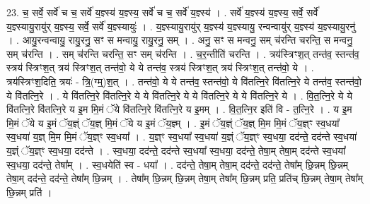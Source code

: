 \documentclass[17pt]{extarticle}
\begin{document}
23. च॒ सर्वे॒ सर्वे॑ च च॒ सर्वे॑ य॒ज्ञ्स्य॑ य॒ज्ञ्स्य॒ सर्वे॑ च च॒ सर्वे॑ य॒ज्ञ्स्य॑ । . सर्वे॑ य॒ज्ञ्स्य॑ य॒ज्ञ्स्य॒ सर्वे॒ सर्वे॑ य॒ज्ञ्स्यायु॒रायु॑र् य॒ज्ञ्स्य॒ सर्वे॒ सर्वे॑ य॒ज्ञ्स्यायुः॑ । . य॒ज्ञ्स्यायु॒रायु॑र् य॒ज्ञ्स्य॑ य॒ज्ञ्स्यायु॒ रन्वन्वायु॑र् य॒ज्ञ्स्य॑ य॒ज्ञ्स्यायु॒रनु॑ । . आयु॒रन्वन्वायु॒ रायु॒रनु॒ सꣳ स मन्वायु॒ रायु॒रनु॒ सम् । . अनु॒ सꣳ स मन्वनु॒ सम् च॑रन्ति चरन्ति॒ स मन्वनु॒ सम् च॑रन्ति । . सम् च॑रन्ति चरन्ति॒ सꣳ सम् च॑रन्ति । . च॒र॒न्तीति॑ चरन्ति । . त्रय॑स्त्रिꣳश॒त् तन्त॑व॒ स्तन्त॑व॒ स्त्रय॑ स्त्रिꣳश॒त् त्रय॑ स्त्रिꣳश॒त् तन्त॑वो॒ ये ये तन्त॑व॒ स्त्रय॑ स्त्रिꣳश॒त् त्रय॑ स्त्रिꣳश॒त् तन्त॑वो॒ ये । . त्रय॑स्त्रिꣳश॒दिति॒ त्रयः॑ - त्रि॒(ग्म्॒)श॒त् । . तन्त॑वो॒ ये ये तन्त॑व॒ स्तन्त॑वो॒ ये वि॑तत्नि॒रे वि॑तत्नि॒रे ये तन्त॑व॒ स्तन्त॑वो॒ ये वि॑तत्नि॒रे । . ये वि॑तत्नि॒रे वि॑तत्नि॒रे ये ये वि॑तत्नि॒रे ये ये वि॑तत्नि॒रे ये ये वि॑तत्नि॒रे ये । . वि॒त॒त्नि॒रे ये ये वि॑तत्नि॒रे वि॑तत्नि॒रे य इ॒म मि॒मं ॅये वि॑तत्नि॒रे वि॑तत्नि॒रे य इ॒मम् । . वि॒त॒त्नि॒र इति॑ वि - त॒त्नि॒रे । . य इ॒म मि॒मं ॅये य इ॒मं ॅय॒ज्ञ्ं ॅय॒ज्ञ् मि॒मं ॅये य इ॒मं ॅय॒ज्ञ्म् । . इ॒मं ॅय॒ज्ञ्ं ॅय॒ज्ञ् मि॒म मि॒मं ॅय॒ज्ञ्ꣳ स्व॒धया᳚ स्व॒धया॑ य॒ज्ञ् मि॒म मि॒मं ॅय॒ज्ञ्ꣳ स्व॒धया᳚ । . य॒ज्ञ्ꣳ स्व॒धया᳚ स्व॒धया॑ य॒ज्ञ्ं ॅय॒ज्ञ्ꣳ स्व॒धया॒ दद॑न्ते॒ दद॑न्ते स्व॒धया॑ य॒ज्ञ्ं ॅय॒ज्ञ्ꣳ स्व॒धया॒ दद॑न्ते । . स्व॒धया॒ दद॑न्ते॒ दद॑न्ते स्व॒धया᳚ स्व॒धया॒ दद॑न्ते॒ तेषा॒म् तेषा॒म् दद॑न्ते स्व॒धया᳚ स्व॒धया॒ दद॑न्ते॒ तेषा᳚म् । . स्व॒धयेति॑ स्व - धया᳚ । . दद॑न्ते॒ तेषा॒म् तेषा॒म् दद॑न्ते॒ दद॑न्ते॒ तेषा᳚म् छि॒न्नम् छि॒न्नम् तेषा॒म् दद॑न्ते॒ दद॑न्ते॒ तेषा᳚म् छि॒न्नम् । . तेषा᳚म् छि॒न्नम् छि॒न्नम् तेषा॒म् तेषा᳚म् छि॒न्नम् प्रति॒ प्रति॑च् छि॒न्नम् तेषा॒म् तेषा᳚म् छि॒न्नम् प्रति॑ । \newline
\end{document}
